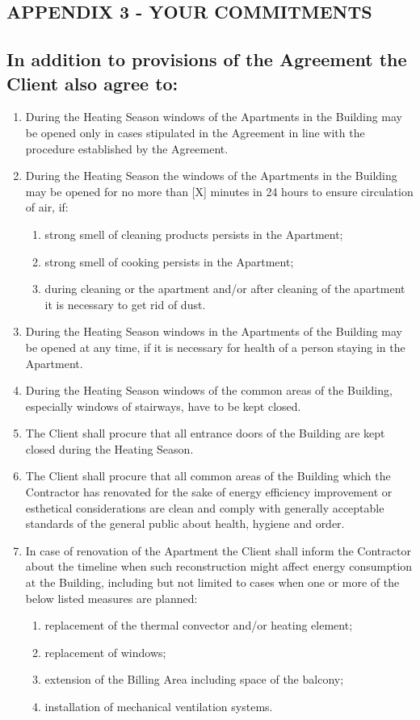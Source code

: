\begin{multicols}{2}
\section{APPENDIX 3 {-} YOUR COMMITMENTS}

\subsection{In addition to provisions of the Agreement the Client also agree to:}

\begin{enumerate}
	\item	During the Heating Season windows of the Apartments in the
		Building may be opened only in cases stipulated in the Agreement in line with
		the procedure established by the Agreement.
	\item   During the Heating Season the windows of the Apartments in the
		Building may be opened for no more than [X] minutes in 24 hours to ensure
		circulation of air, if:
	\begin{enumerate}
		\item	strong smell of cleaning products persists in the Apartment;
		\item	strong smell of cooking persists in the Apartment;
		\item	during cleaning or the apartment and/or after cleaning of the apartment it is necessary to get rid of dust.
	\end{enumerate}
	\item	During the Heating Season windows in the Apartments of the
		Building may be opened at any time, if it is necessary for health of a person
		staying in the Apartment.
	\item	During the Heating Season windows of the common areas of the
		Building, especially windows of stairways, have to be kept closed.
	\item	The Client shall procure that all entrance doors of the Building are kept closed during the Heating Season.
	\item	The Client shall procure that all common areas of the Building
		which the Contractor has renovated for the sake of energy efficiency
		improvement or esthetical considerations are clean and comply with generally
		acceptable standards of the general public about health, hygiene and order.
	\item	In case of renovation of the Apartment the Client shall inform
		the Contractor about the timeline when such reconstruction might affect energy
		consumption at the Building, including but not limited to cases when one or
		more of the below listed measures are planned:
	\begin{enumerate}
		\item	replacement of the thermal convector and/or heating element;
		\item	replacement of windows;
		\item	extension of the Billing Area including space of the balcony;
		\item	installation of mechanical ventilation systems.
	\end{enumerate}
\end{enumerate}


\end{multicols}
